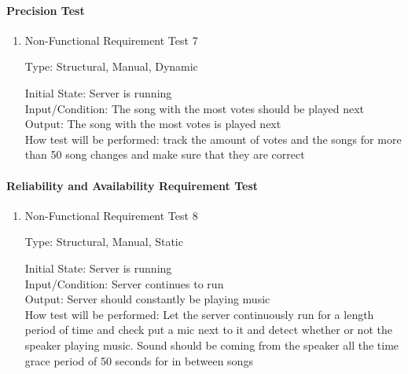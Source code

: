 \documentclass[12pt, titlepage]{article}
\begin{document}
\paragraph{Precision Test}

\begin{enumerate}

					
\item{Non-Functional Requirement Test 7\\}

Type: Structural, Manual, Dynamic
					
Initial State: Server is running \\
					
Input/Condition: The song with the most votes should be played next \\
					
Output: The song with the most votes is played next \\
					
How test will be performed: track the amount of votes and the songs for more than 50 song changes
and make sure that they are correct \\
\end{enumerate}


\paragraph{Reliability and Availability Requirement Test}

\begin{enumerate}

\item{Non-Functional Requirement Test 8\\}

Type: Structural, Manual, Static
					
Initial State: Server is running \\
					
Input/Condition: Server continues to run \\
					
Output: Server should constantly be playing music \\
					
How test will be performed: Let the server continuously run for a length period of time and check
put a mic next to it and detect whether or not the speaker playing music. Sound should be coming 
from the speaker all the time grace period of 50 seconds for in between songs \\
\end{enumerate}
\end{document}
